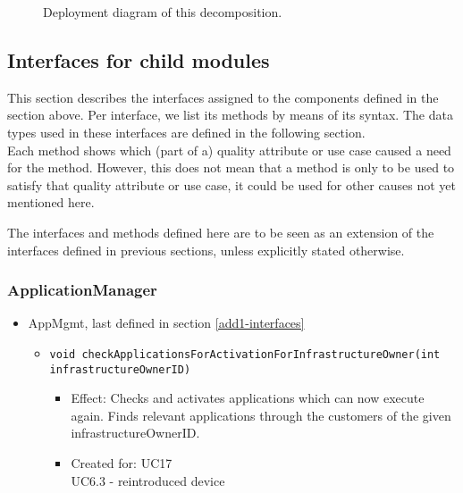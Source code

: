 {{{        \begin{figure}[!h]
        	\centering
        	\caption{Deployment diagram of this decomposition.}
            \label{fig:FIGURELABEL}
        \end{figure}


\subsection{Interfaces for child modules}\label{add2-interfaces}
    This section describes the interfaces assigned to the components defined
    in the section above. Per interface, we list its methods by means of its
    syntax. The data types used in these interfaces are defined in the following section. \\

    Each method shows which (part of a) quality attribute or use case caused
    a need for the method. However, this does not mean that a method is
    only to be used to satisfy that quality  attribute or use case, it could
    be used for other causes not yet mentioned here.

    The interfaces and methods defined here are to be seen as an
    extension of the interfaces defined in previous sections, unless
    explicitly stated otherwise.

    \subsubsection{ApplicationManager}
        \begin{itemize}
            \item AppMgmt, last defined in section \ref{add1-interfaces}
                \begin{itemize}
                    \item \texttt{void checkApplicationsForActivationForInfrastructureOwner(int infrastructureOwnerID)}
                        \begin{itemize}
                			\item Effect: Checks and activates applications which can now execute again. Finds relevant applications through the customers of the given infrastructureOwnerID.
                			\item Created for: UC17 \\ UC6.3 - reintroduced device
                        \end{itemize}
                \end{itemize}


\end{itemize}}}}
